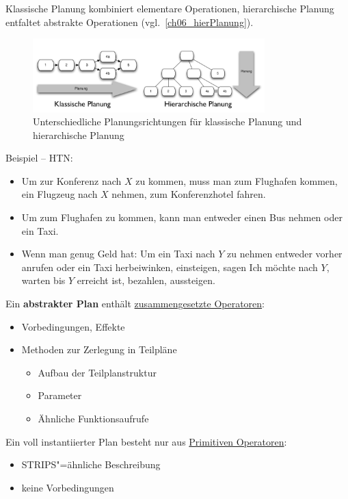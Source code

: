 Klassische Planung kombiniert elementare Operationen, hierarchische Planung \glqq entfaltet\grqq{} abstrakte Operationen (vgl.\ \autoref{ch06_hierPlanung}).
\begin{figure}[ht]
	\centering 
	\includegraphics[width=0.8\textwidth]{figures/ch06_hierarchischePlanung.png}
	\caption{Unterschiedliche Planungsrichtungen für klassische Planung und hierarchische Planung}
	\label{ch06_hierPlanung}
\end{figure}
Beispiel -- HTN:
\begin{itemize}
\item Um zur Konferenz nach $X$ zu kommen, muss man zum Flughafen kommen, ein Flugzeug nach $X$ nehmen, zum Konferenzhotel fahren.
\item Um zum Flughafen zu kommen, kann man entweder einen Bus nehmen oder ein Taxi.
\item Wenn man genug Geld hat: Um ein Taxi nach $Y$ zu nehmen entweder vorher anrufen oder ein Taxi herbeiwinken, einsteigen, sagen \glqq Ich möchte nach $Y$\grqq, warten bis $Y$ erreicht ist, bezahlen, aussteigen.
\end{itemize}
Ein \textbf{abstrakter Plan} enthält \underline{zusammengesetzte Operatoren}:
\begin{itemize}
	\item Vorbedingungen, Effekte
	\item Methoden zur Zerlegung in Teilpläne
	\begin{itemize}
		\item Aufbau der Teilplanstruktur
		\item Parameter
		\item Ähnliche Funktionsaufrufe
	\end{itemize}
\end{itemize}
Ein voll instantiierter Plan besteht nur aus \underline{Primitiven Operatoren}:
\begin{itemize}
	\item STRIPS"=ähnliche Beschreibung
	\item keine Vorbedingungen
\end{itemize}

